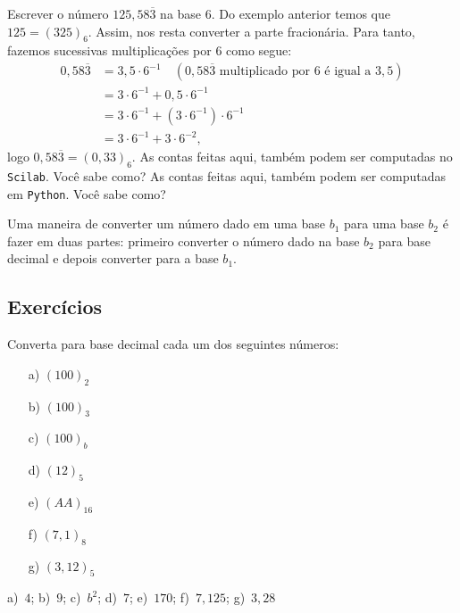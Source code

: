 \begin{ex} Escrever o número $125,58\overline{3}$ na base $6$. Do exemplo anterior temos que $125=(325)_6$. Assim, nos resta converter a parte fracionária. Para tanto, fazemos sucessivas multiplicações por $6$ como segue:
  \begin{equation*}
    \begin{split}
    0,58\overline{3} &= 3,5\cdot 6^{-1}\quad(\mbox{$0,58\overline{3}$ multiplicado por $6$ é igual a $3,5$})\\
    &= 3\cdot 6^{-1} + 0,5\cdot 6^{-1}\\
    &= 3\cdot 6^{-1} + (3\cdot 6^{-1})\cdot 6^{-1}\\
    &= 3\cdot 6^{-1} + 3\cdot 6^{-2},      
    \end{split}
  \end{equation*}
logo $0,58\overline{3} = (0,33)_6$.
\ifisscilab
As contas feitas aqui, também podem ser computadas no \verb+Scilab+. Você sabe como?
\fi
\ifispython
As contas feitas aqui, também podem ser computadas em \verb+Python+. Você sabe como?
\fi
\end{ex}

Uma maneira de converter um número dado em uma base $b_1$ para uma base $b_2$ é fazer em duas partes: primeiro converter o número dado na base $b_2$ para base decimal e depois converter para a base $b_1$.

\subsection*{Exercícios}

\indent 
\begin{exer} Converta para base decimal cada um dos seguintes números:
  \begin{multicols}{4}
    \begin{itemize}
    \item[a)]  $(100)_2$
    \item[b)]  $(100)_3$
    \item[c)]  $(100)_b$
    \item[d)]  $(12)_5$
    \item[e)]  $(AA)_{16}$
    \item[f)]  $(7,1)_8$
    \item[g)]  $(3,12)_5$
    \end{itemize}    
  \end{multicols}
\end{exer}
\begin{resp}
  
    a)~$4$; b)~$9$; c)~$b^2$; d)~$7$; e)~$170$; f)~$7,125$; g)~$3,28$
  
\end{resp}

